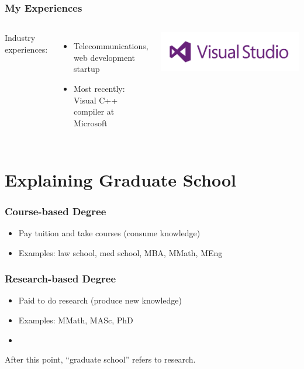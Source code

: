 \documentclass{beamer}
\begin{document}
\begin{frame}
  \frametitle{My Experiences}
  \begin{columns}[c]
    Industry experiences:
    \begin{itemize}
      \item Telecommunications, web development startup
      \item Most recently: Visual C++ compiler at Microsoft
    \end{itemize}
    \includegraphics[width=\linewidth]{images/vs-logo.png}
  \end{columns}
\end{frame}

\section{Explaining Graduate School}
\begin{frame}
  \frametitle{Course-based Degree}
  \begin{itemize}
    \item Pay tuition and take courses (consume knowledge)
    \item Examples: law school, med school, MBA, MMath, MEng
  \end{itemize}
\end{frame}

\begin{frame}
  \frametitle{Research-based Degree}
  \begin{itemize}
    \item Paid to do research (produce new knowledge)
    \item Examples: MMath, MASc, PhD
    \item
      \href{http://matt.might.net/articles/phd-school-in-pictures/}{%
        \color{blue}{See also Matt Might's illustrated guide to a Ph.D.}
      }
  \end{itemize}
  \vspace{2em}
  After this point, ``graduate school'' refers to \alert{research}.
\end{frame}
\end{document}
